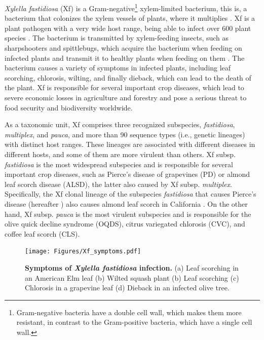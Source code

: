 \textit{Xylella fastidiosa} (Xf) is a Gram-negative\footnote{Gram-negative
  bacteria have a double cell wall, which makes them more resistant, in
  contrast to the Gram-positive bacteria, which have a single cell wall.}
xylem-limited bacterium, this is, a bacterium that colonizes the xylem
vessels
of plants, where it multiplies \cite{Wells1987}. Xf is a plant pathogen with
a
very wide host range, being able to infect over 600 plant species
\cite{Delbianco2019}. The bacterium is transmitted by xylem-feeding insects,
such as sharpshooters and spittlebugs, which acquire the bacterium when
feeding
on infected plants and transmit it to healthy plants when feeding on them
\cite{Redak2004, Cornara2018}. The bacterium causes a variety of
symptoms in infected plants, including leaf scorching, chlorosis, wilting,
and
finally dieback, which can lead to the death of the plant. Xf is responsible
for several important crop diseases, which lead to severe economic losses in
agriculture and forestry and pose a serious threat to food security and
biodiversity worldwide.

As a taxonomic unit, Xf comprises three recognized subspecies,
\textit{fastidiosa}, \textit{multiplex}, and \textit{pauca}, and more than 90
sequence types (i.e., genetic lineages) with distinct host ranges.
These lineages are associated with different diseases in different hosts, and
some of them are more virulent than others. Xf subsp. \textit{fastidiosa} is
the most widespread subspecies and is responsible for several important crop
diseases, such as Pierce's disease of grapevines (PD) or almond leaf scorch
disease (ALSD), the latter also caused by Xf subsp. \textit{multiplex}.
Specifically, the Xf clonal lineage of the subspecies \textit{fastidiosa}
that causes Pierce's disease (hereafter \xf) also causes almond leaf scorch
in
California \cite{Almeida2003}. On the other hand, Xf subsp.
\textit{pauca} is the most virulent subspecies and is responsible for the
olive
quick decline syndrome (OQDS), citrus variegated chlorosis (CVC), and coffee
leaf scorch (CLS).

\begin{figure}[H]
  \centering
  \texttt{[image: Figures/Xf\_symptoms.pdf]}
  \caption[Symptoms of \textit{Xylella fastidiosa} infection]{
    \textbf{Symptoms of \textit{Xylella fastidiosa} infection.} (a) Leaf
    scorching in an American Elm leaf (b) Wilted squash plant (b) Leaf
    scorching (c) Chlorosis in a grapevine leaf (d) Dieback in an infected
    olive tree.}
  \label{fig:Xylella}
\end{figure}

